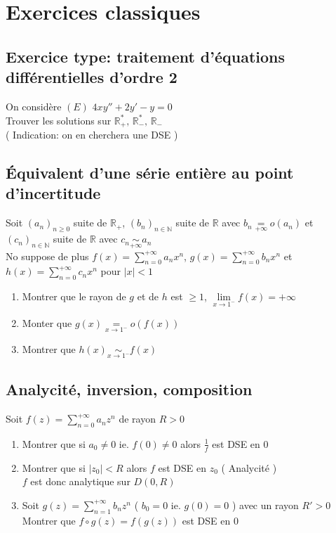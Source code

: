 \documentclass[10pt,a4paper]{article}
\theoremstyle{definition}
\begin{document}
\section{Exercices classiques}
\subsection{Exercice type: traitement d'équations différentielles d'ordre 2}
\noindent On considère \((E)\) \(4xy'' + 2y' - y = 0\) \\
Trouver les solutions sur \(\mathbb{R}_{+}^{*},\, \mathbb{R}_{-}^{*},\, \mathbb{R}_{-}\) \\
( Indication: on en cherchera une DSE )

\subsection{Équivalent d'une série entière au point d'incertitude}
\noindent Soit \((a_n)_{n \geq 0}\) suite de \(\mathbb{R}_+\), \((b_n)_{n \in \mathbb{N}}\) suite de \(\mathbb{R}\) avec \(b_n \underset{+\infty}{=} o(a_n)\) et \((c_n)_{n \in \mathbb{N}}\) suite de \(\mathbb{R}\) avec \(c_n \underset{+\infty}{\sim} a_n\) \\
No suppose de plus \(f(x) = \sum\limits_{n = 0}^{+\infty} a_n x^n\), \(g(x) = \sum\limits_{n = 0}^{+\infty} b_n x^n\) et \(h(x) = \sum\limits_{n = 0}^{+\infty} c_n x^n\) pour \(|x| < 1\)
\begin{enumerate}
    \item Montrer que le rayon de \(g\) et de \(h\) est \(\geq 1\), \(\lim\limits_{x \to 1^-} f(x) = +\infty\)
    \item Monter que \(g(x) \underset{x \to 1^-}{=} o(f(x))\)
    \item Montrer que \(h(x) \underset{x \to 1^-}{\sim} f(x)\)
\end{enumerate}

\subsection{Analycité, inversion, composition}
\noindent Soit \(f(z) = \sum\limits_{n = 0}^{+\infty} a_n z^n\) de rayon \(R > 0\)
\begin{enumerate}
    \item Montrer que si \(a_0 \neq 0\) ie. \(f(0) \neq 0\) alors \(\frac{1}{f}\) est DSE en \(0\)
    \item Montrer que si \(|z_0| < R\) alors \(f\) est DSE en \(z_0\) ( Analycité ) \\
    \(f\) est donc analytique sur \(D(0, R)\)
    \item Soit \(g(z) = \sum\limits_{n = 1}^{+\infty} b_n z^n\) ( \(b_0 = 0\) ie. \(g(0) = 0\) ) avec un rayon \(R' > 0\) \\
    Montrer que \(f \circ g(z) = f(g(z))\) est DSE en \(0\)
\end{enumerate}
\end{document}

